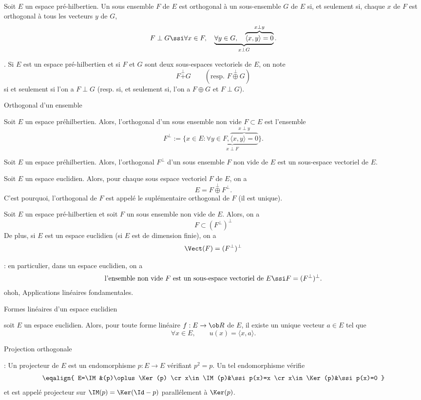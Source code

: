 \Definition []  Soit $E$ un espace pr\'e-hilbertien. Un sous ensemble $F$ de $E$ est orthogonal \`a un sous-ensemble $G$ de $E$ si, 
et seulement si, chaque $x$ de $F$ est orthogonal \`a tous les vecteurs $y$ de $G$, 
$$
F\perp G \ssi \forall x\in F,\quad \underbrace{\forall y\in G, \quad \overbrace{\langle x,y\rangle=0}^{x\perp y}}_{x\perp G}. 
$$

\Remarque. Si $E$ est un espace pr\'e-hilbertien et si $F$ et $G$ sont deux sous-espaces vectoriels de $E$, on note 
$$
F\mathop{+}\limits^\perp G\qquad (\mbox{resp. }F\mathop{\oplus}\limits^\perp G)
$$
si et seulement si l'on a $F\perp G$ (resp. si, et seulement si, l'on a $F\oplus G$ et $F\perp G$). 
\bigskip


\Concept [] Orthogonal d'un ensemble

\Definition []  Soit $E$ un espace pr\'ehilbertien. Alors, l'orthogonal d'un sous ensemble non vide $F\subset E$ est l'ensemble 
$$
F^\perp:=\{x\in E:\underbrace{\forall y\in F, \overbrace{\langle x,y\rangle=0}^{x\perp y}}_{x\perp F}\}.
$$

\Propriete []  Soit $E$ un espace pr\'ehilbertien. Alors, l'orthogonal $F^\perp$ d'un sous ensemble $F$ non vide de $E$ est un sous-espace vectoriel de $E$. 
\bigskip

\Propriete []  Soit $E$ un espace euclidien. Alors, pour chaque sous espace vectoriel $F$ de $E$, on a 
$$
E=F\mathop{\oplus}\limits^\perp F^\perp.
$$
C'est pourquoi, l'orthogonal de $F$ est appel\'e le supl\'ementaire orthogonal de $F$ (il est unique). 
\bigskip


\Propriete []  Soit $E$ un espace pr\'e-hilbertien et soit $F$ un sous ensemble non vide de $E$. 
Alors, on a 
$$
F\subset (F^\perp)^\perp
$$
De plus, si $E$ est un espace euclidien (si $E$ est de dimension finie), on a 
$$
\Vect(F)=(F^\perp)^\perp
$$

\Remarque : en particulier, dans un espace euclidien, on a 
$$
\mbox{l'ensemble non vide }F\mbox{ est un sous-espace vectoriel de $E$}\ssi F=(F^\perp)^\perp.
$$
\Subsection ohoh, Applications lin\'eaires fondamentales.

\Concept [] Formes lin\'eaires d'un espace euclidien

\Propriete []  soit $E$ un espace euclidien. Alors, pour toute forme lin\'eaire $f:E\to\ob R$ de $E$, il existe un unique vecteur $a\in E$ tel que 
$$
\forall x\in E, \qquad u(x)=\langle x,a\rangle.
$$

\Concept [] Projection orthogonale

\Rappel :  Un projecteur de $E$ est un endomorphisme $p:E\to E$ v\'erifiant $p^2=p$. Un tel endomorphisme v\'erifie
$$
\eqalign{
E=\IM&(p)\oplus\Ker(p)
\cr
x\in\IM(p)&\ssi p(x)=x
\cr
x\in \Ker(p)&\ssi p(x)=0
}
$$
et est appel\'e projecteur sur $\IM(p)=\Ker(\Id-p)$ parall\'element \`a $\Ker(p)$. \pn
\bigskip

